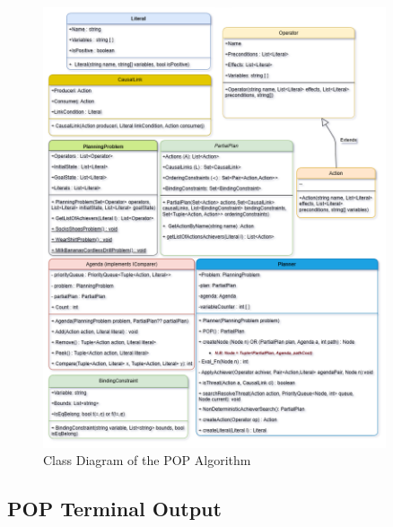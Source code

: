 \begin{figure}[ht]
    \centering
    \includegraphics[width=0.9\textwidth]{images/POP.png}
    \caption[Class Diagram of the POP Algorithm]{Class Diagram of the POP Algorithm}
    \label{fig:pop}
\end{figure}

\subsection{\ac{POP} Terminal Output} \label{subsec:pop_output}
